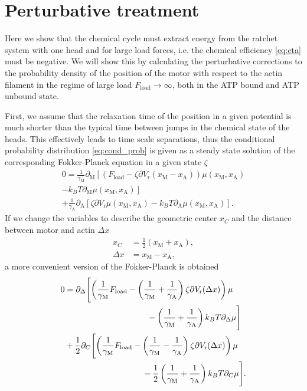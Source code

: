 \documentclass[aps,pre,twocolumn,showpacs,showkeys,superscriptaddress,floatfix]{revtex4-1}
\begin{document}
\appendix* 
\section{Perturbative treatment}
\label{sec:perturb}
Here we show that the chemical cycle must extract energy from the ratchet system with one head and for large load forces, 
i.e. the chemical efficiency \eqref{eq:eta} must be negative. 
We will show this by calculating the perturbative corrections to the probability density of the position of the motor with respect to the actin filament in the regime of large load $F_\text{load} \to \infty$, both in the ATP bound and ATP unbound state. 

First, we assume that the relaxation time of the position in a given potential is much shorter than the typical time between jumps in the chemical state of the heads. 
This effectively leads to time scale separations,
thus the conditional probability distribution \eqref{eq:cond_prob} is given as a steady state solution of the corresponding Fokker-Planck equation in a given state $\zeta$
\begin{multline*}
0 = \frac{1}{\gamma_\text{M}} \partial_\text{M} \left[ \left( F_\text{load} - \zeta \partial V_\text{r}( x_\text{M} - x_\text{A} ) \right) \mu\left( x_\text{M}, x_\text{A} \right)
\right. \\ \left.
- k_B T \partial_\text{M} \mu\left( x_\text{M}, x_\text{A} \right) \right] 
\\
+ \frac{1}{\gamma_\text{A}} \partial_\text{A} \left[ 
\zeta \partial V_\text{r} \mu( x_\text{M}, x_\text{A} ) 
- k_B T \partial_\text{A} \mu\left( x_\text{M}, x_\text{A} \right) 
\right] .
\end{multline*}
If we change the variables to describe the geometric center $x_C$ and the distance between motor and actin $\Delta x$
\begin{align*}
x_C &= \frac{1}{2} ( x_\text{M} + x_\text{A} ) , \\
\Delta x &= x_\text{M} - x_\text{A}, 
\end{align*}
a more convenient version of the Fokker-Planck is obtained
\begin{align*}
0 &= \begin{multlined}[t][.4\textwidth]
\partial_\Delta \Biggl[ 
\left( \frac{1}{\gamma_\text{M}} F_\text{load} - \left( \frac{1}{\gamma_\text{M}} + \frac{1}{\gamma_\text{A}} \right) \zeta \partial V_\text{r}( \Delta x ) \right) \mu
\\ 
- \left( \frac{1}{\gamma_\text{M}} + \frac{1}{\gamma_\text{A}} \right) k_B T \partial_\Delta \mu 
\Biggr] 
\end{multlined}
\\
&+ \begin{multlined}[t][.4\textwidth]
\frac{1}{2} \partial_C \Biggl[
\left( \frac{1}{\gamma_\text{M}} F_\text{load} - \left( \frac{1}{\gamma_\text{M}} - \frac{1}{\gamma_\text{A}} \right) \zeta \partial V_\text{r}( \Delta x ) \right) \mu
\\
- \frac{1}{2} \left( \frac{1}{\gamma_\text{M}} + \frac{1}{\gamma_\text{A}} \right) k_B T \partial_C \mu 
\Biggr] .
\end{multlined}
\end{align*}
\end{document}
